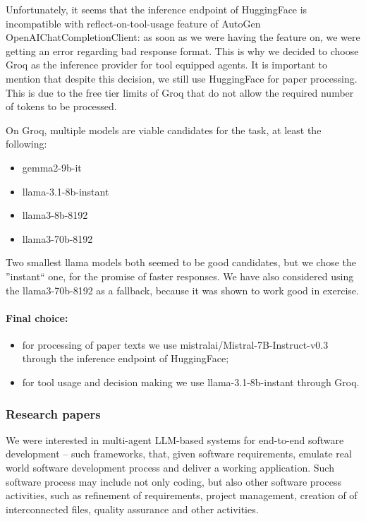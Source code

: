 Unfortunately, it seems that the inference endpoint of HuggingFace is incompatible with reflect-on-tool-usage feature of AutoGen OpenAIChatCompletionClient: as soon as we were having the feature on, we were getting an error regarding bad response format. This is why we decided to choose Groq as the inference provider for tool equipped agents. It is important to mention that despite this decision, we still use HuggingFace for paper processing. This is due to the free tier limits of Groq that do not allow the required number of tokens to be processed.

On Groq, multiple models are viable candidates for the task, at least the following:

\begin{itemize}
	\item gemma2-9b-it
	\item llama-3.1-8b-instant
	\item llama3-8b-8192
	\item llama3-70b-8192
\end{itemize}

Two smallest llama models both seemed to be good candidates, but we chose the ''instant`` one, for the promise of faster responses. We have also considered using the llama3-70b-8192 as a fallback, because it was shown to work good in exercise.

\paragraph{Final choice:}

\begin{itemize}
	\item for processing of paper texts we use mistralai/Mistral-7B-Instruct-v0.3 through the inference endpoint of HuggingFace;
	\item for tool usage and decision making we use llama-3.1-8b-instant through Groq.
\end{itemize}


\subsubsection{Research papers}

We were interested in multi-agent LLM-based systems for end-to-end software development -- such frameworks, that, given software requirements, emulate real world software development process and deliver a working application. Such software process  may include not only coding, but also other software process activities, such as refinement of requirements, project management, creation of of interconnected files, quality assurance and other activities. 

